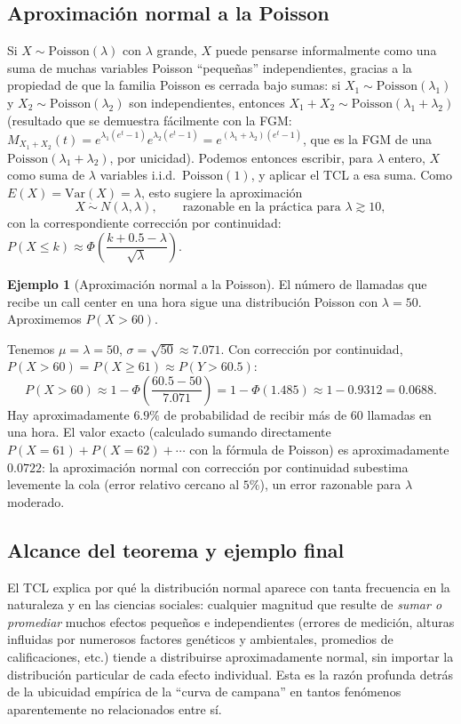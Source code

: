 \documentclass[11pt,a4paper]{article}
\theoremstyle{plain}
\theoremstyle{definition}
\newtheorem{ejemplo}[teorema]{Ejemplo}
\theoremstyle{remark}
\begin{document}
\subsection{Aproximación normal a la Poisson}

Si $X\sim\text{Poisson}(\lambda)$ con $\lambda$ grande, $X$ puede pensarse informalmente como una suma de muchas variables Poisson ``pequeñas'' independientes, gracias a la propiedad de que la familia Poisson es cerrada bajo sumas: si $X_1\sim\text{Poisson}(\lambda_1)$ y $X_2\sim\text{Poisson}(\lambda_2)$ son independientes, entonces $X_1+X_2\sim\text{Poisson}(\lambda_1+\lambda_2)$ (resultado que se demuestra fácilmente con la FGM: $M_{X_1+X_2}(t)=e^{\lambda_1(e^t-1)}e^{\lambda_2(e^t-1)}=e^{(\lambda_1+\lambda_2)(e^t-1)}$, que es la FGM de una $\text{Poisson}(\lambda_1+\lambda_2)$, por unicidad). Podemos entonces escribir, para $\lambda$ entero, $X$ como suma de $\lambda$ variables i.i.d.\ $\text{Poisson}(1)$, y aplicar el TCL a esa suma. Como $E(X)=\text{Var}(X)=\lambda$, esto sugiere la aproximación
\[
X\ \dot\sim\ N(\lambda,\lambda), \qquad\text{razonable en la práctica para } \lambda\gtrsim10,
\]
con la correspondiente corrección por continuidad: $P(X\leq k)\approx\Phi\!\left(\dfrac{k+0.5-\lambda}{\sqrt\lambda}\right)$.

\begin{ejemplo}[Aproximación normal a la Poisson]
El número de llamadas que recibe un call center en una hora sigue una distribución Poisson con $\lambda=50$. Aproximemos $P(X>60)$.

Tenemos $\mu=\lambda=50$, $\sigma=\sqrt{50}\approx7.071$. Con corrección por continuidad, $P(X>60)=P(X\geq61)\approx P(Y>60.5)$:
\[
P(X>60) \approx 1-\Phi\!\left(\frac{60.5-50}{7.071}\right) = 1-\Phi(1.485) \approx 1-0.9312 = 0.0688.
\]
Hay aproximadamente $6.9\%$ de probabilidad de recibir más de $60$ llamadas en una hora. El valor exacto (calculado sumando directamente $P(X=61)+P(X=62)+\cdots$ con la fórmula de Poisson) es aproximadamente $0.0722$: la aproximación normal con corrección por continuidad subestima levemente la cola (error relativo cercano al $5\%$), un error razonable para $\lambda$ moderado.
\end{ejemplo}

\subsection{Alcance del teorema y ejemplo final}

El TCL explica por qué la distribución normal aparece con tanta frecuencia en la naturaleza y en las ciencias sociales: cualquier magnitud que resulte de \emph{sumar o promediar} muchos efectos pequeños e independientes (errores de medición, alturas influidas por numerosos factores genéticos y ambientales, promedios de calificaciones, etc.) tiende a distribuirse aproximadamente normal, sin importar la distribución particular de cada efecto individual. Esta es la razón profunda detrás de la ubicuidad empírica de la ``curva de campana'' en tantos fenómenos aparentemente no relacionados entre sí.
\end{document}
